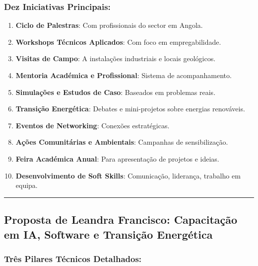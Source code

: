 \documentclass[12pt,a4paper]{article}
\begin{document}
\subsubsection*{Dez Iniciativas Principais:}

\begin{enumerate}[itemsep=0.2cm]
    \item \textbf{Ciclo de Palestras}: Com profissionais do sector em Angola.
    
    \item \textbf{Workshops Técnicos Aplicados}: Com foco em empregabilidade.
    
    \item \textbf{Visitas de Campo}: A instalações industriais e locais geológicos.
    
    \item \textbf{Mentoria Académica e Profissional}: Sistema de acompanhamento.
    
    \item \textbf{Simulações e Estudos de Caso}: Baseados em problemas reais.
    
    \item \textbf{Transição Energética}: Debates e mini-projetos sobre energias renováveis.
    
    \item \textbf{Eventos de Networking}: Conexões estratégicas.
    
    \item \textbf{Ações Comunitárias e Ambientais}: Campanhas de sensibilização.
    
    \item \textbf{Feira Académica Anual}: Para apresentação de projetos e ideias.
    
    \item \textbf{Desenvolvimento de Soft Skills}: Comunicação, liderança, trabalho em equipa.
\end{enumerate}

\textcolor{spe-secondary}{\hspace{0.5cm}\rule{0.4\linewidth}{0.8pt}}
\subsection{Proposta de Leandra Francisco: Capacitação em IA, Software e Transição Energética}

\subsubsection*{Três Pilares Técnicos Detalhados:}
\end{document}
